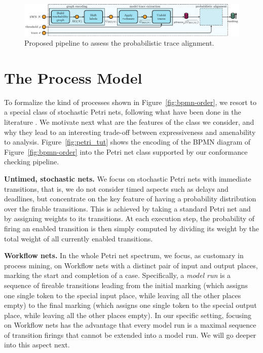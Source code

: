 \begin{figure}[!b]
	\centering\includegraphics[width=\textwidth]{images/pipeline}
	\caption{Proposed pipeline to assess the probabilistic trace alignment.}\label{fig:pipe}
\end{figure}

\section{The Process Model}
To formalize the kind of processes shown in Figure~\ref{fig:bpmn-order}, we resort to a special class of stochastic Petri nets, following what have been done in the literature \cite{DBLP:conf/bpm/LeemansSA19,DBLP:journals/tosem/PolyvyanyySWCM20}. We motivate next what are the features of the class we consider, and why they lead to an interesting trade-off between expressiveness and amenability to analysis. Figure~\ref{fig:petri_tut} shows the encoding of the BPMN diagram of Figure~\ref{fig:bpmn-order} into the Petri net class supported by our conformance checking pipeline.

\smallskip
\noindent
\textbf{Untimed, stochastic nets.}
We focus on stochastic Petri nets with immediate transitions, that is, we do not consider timed aspects such as delays and deadlines, but concentrate on the key feature of having a probability distribution over the firable transitions. This is achieved by taking a standard Petri net and by assigning weights to its transitions. At each execution step, the probability of firing an enabled transition is then simply computed by dividing its weight by the total weight of all currently enabled transitions.


\noindent
\textbf{Workflow nets.} In the whole Petri net spectrum, we focus, as customary in process mining, on Workflow nets with a distinct pair of input and output places, marking the start and completion of a case. Specifically, a \emph{model run} is a sequence of fireable transitions leading from the initial marking (which assigns one single token to the special input place, while leaving all the other places empty) to the final marking (which assigns one single token to the special output place, while leaving all the other places empty). In our specific setting, focusing on Workflow nets has the advantage that every model run is a maximal sequence of transition firings that cannot be extended into a model run. We will go deeper into this aspect next.



